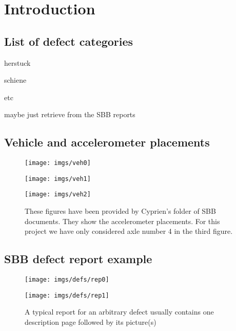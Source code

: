 

\newpage
\cleardoublepage
\appendix
\chapter{Introduction}
\section{List of defect categories}
herstuck 

schiene

etc

maybe just retrieve from the SBB reports


\section{Vehicle and accelerometer placements}
\label{figs:veh}
\begin{figure}[H]
	\centering
	\texttt{[image: imgs/veh0]}
	\label{fig:veh0}
	
	\texttt{[image: imgs/veh1]}
	\label{fig:veh1}
	
	\texttt{[image: imgs/veh2]}
	\caption{These figures have been provided by Cyprien's folder of SBB documents. They show the accelerometer placements. For this project we have only considered axle number 4 in the third figure.}
	\label{fig:veh2}
\end{figure}

\section{SBB defect report example}
\label{app:report}
\begin{figure}[H]
	\centering
	\texttt{[image: imgs/defs/rep0]}
	\caption{}
	\texttt{[image: imgs/defs/rep1]}
	\caption{A typical report for an arbitrary defect usually contains one description page followed by its picture(s)}
	\label{fig:veh2}
\end{figure}


